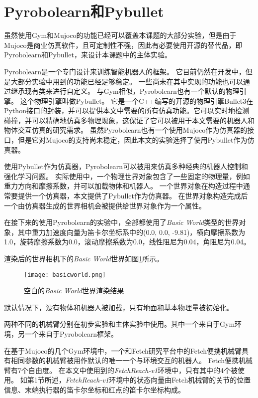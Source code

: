 \section{Pyrobolearn和Pybullet}
虽然使用Gym和Mujoco的功能已经可以覆盖本课题的大部分实验，但是由于Mujoco是商业仿真软件，且可定制性不强，因此有必要使用开源的替代品，即Pyrobolearn和Pybullet，来设计本课题中的主体实验。

Pyrobolearn是一个专门设计来训练智能机器人的框架\cite{delhaisse2019pyrobolearn}。
它目前仍然在开发中，但是大部分实验中用到的功能已经足够稳定。
一些尚未在其中实现的功能也可以通过继承现有类来进行自定义。
与Gym相似，Pyrobolearn也有一个默认的物理引擎。
这个物理引擎叫做Pybullet\cite{coumans2016pybullet}。
它是一个C++编写的开源的物理引擎Bullet3在Python接口的封装，并可以提供本文中需要的所有仿真功能。它可以实时地检测碰撞，并可以精确地仿真多物理现象，这保证了它可以被用于本文需要的机器人和物体交互仿真的研究需求。
虽然Pyrobolearn也有一个使用Mujoco作为仿真器的接口，但是它对Mujoco的支持尚未稳定，因此本文的实验选择了使用Pybullet作为仿真器。

使用Pybullet作为仿真器，Pyrobolearn可以被用来仿真多种经典的机器人控制和强化学习问题。
实际使用中，一个物理世界对象包含了一些固定的物理量，例如重力方向和摩擦系数，并可以加载物体和机器人。
一个世界对象在构造过程中通常要提供一个仿真器，本文提供了Pybullet作为仿真器。
在世界对象构造完成后一个由仿真器生成的世界相机会被提供给世界对象作为一个属性。

在接下来的使用Pyrobolearn的实验中，全部都使用了\emph{Basic World}类型的世界对象，其中重力加速度向量为笛卡尔坐标系中的(0.0, 0.0, -9.81)，横向摩擦系数为1.0，旋转摩擦系数为0.0，滚动摩擦系数为0.0，线性阻尼为0.04，角阻尼为0.04。

渲染后的世界相机下的\emph{Basic World}世界如图\ref{basicworld}所示。
    \begin{figure}
        \centering
        \texttt{[image: basicworld.png]}
        \caption{空白的\emph{Basic World}世界渲染结果}
        \label{basicworld}
    \end{figure}
默认情况下，没有物体和机器人被加载，只有地面和基本物理量被初始化。

两种不同的机械臂分别在初步实验和主体实验中使用。其中一个来自于Gym环境，另一个来自于Pyrobolearn框架。

在基于Mujoco的几个Gym环境中，一个和Fetch研究平台中的Fetch便携机械臂具有相同参数的机械臂被用作默认的唯一一个与环境交互的机器人\cite{Wise2016FetchF}。
Fetch便携机械臂有7个自由度。
在本文中使用到的\emph{FetchReach-v1}环境中，只有其中的4个被使用。
如第1节所述，\emph{FetchReach-v1}环境中的状态向量由Fetch机械臂的关节的位置信息、末端执行器的笛卡尔坐标和红点的笛卡尔坐标构成。

